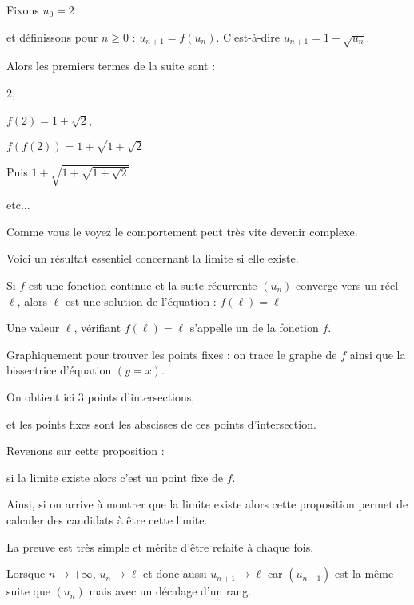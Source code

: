 Fixons $u_0= 2$ 

\change

et définissons pour $n\ge0$ :
$u_{n+1}=f(u_n)  $. C'est-à-dire $u_{n+1}=1+\sqrt{u_n}$.

\change

Alors les premiers termes de la suite sont :

$2$,

\change

$f(2)=1+\sqrt{2}$, 

\change

$f(f(2))= 1+\sqrt{1+\sqrt{2}}$

\change

Puis $1+\sqrt{1+\sqrt{1+\sqrt{2}}}$

\change 

etc...

Comme vous le voyez le comportement peut très vite devenir complexe.


\diapo

Voici un résultat essentiel concernant la limite si elle existe.


Si $f$ est une fonction continue et la suite récurrente $(u_n)$ converge vers un réel $\ell$, alors
$\ell$ est une solution de l'équation :
$f(\ell)=\ell$  

\change

Une valeur $\ell$, vérifiant $f(\ell)=\ell$ s'appelle un  de la fonction $f$.

Graphiquement pour trouver les points fixes :
on trace le graphe de $f$ ainsi que la bissectrice d'équation $(y=x)$.

On obtient ici $3$ points d'intersections,

et les points fixes sont les abscisses de ces points d'intersection.


\diapo

Revenons sur cette proposition :

si la limite existe alors c'est un point fixe de $f$.

Ainsi, si on arrive à montrer que la limite existe alors cette proposition permet 
de calculer des candidats à être cette limite.

La preuve est très simple et mérite d'être refaite à chaque fois. 

\change


Lorsque $n\to +\infty$, $u_n\to \ell$ et donc aussi $u_{n+1} \to \ell$
car $(u_{n+1})$ est la même suite que $(u_n)$ mais avec un décalage d'un rang.


